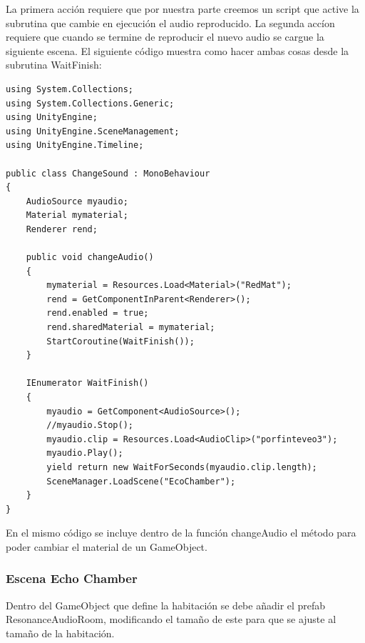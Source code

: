 \quad La primera acción requiere que por nuestra parte creemos un script que active la subrutina que cambie en ejecución el audio reproducido. La segunda accíon requiere que cuando se termine de reproducir el nuevo audio se cargue la siguiente escena. El siguiente código muestra como hacer ambas cosas desde la subrutina WaitFinish:\\

\lstset{language=[sharp]C, breaklines=true, basicstyle=\footnotesize}
\begin{lstlisting}[frame=single, caption={ChangeSound.cs}]
using System.Collections;
using System.Collections.Generic;
using UnityEngine;
using UnityEngine.SceneManagement;
using UnityEngine.Timeline;

public class ChangeSound : MonoBehaviour
{
    AudioSource myaudio;
    Material mymaterial;
    Renderer rend;

    public void changeAudio()
    {
        mymaterial = Resources.Load<Material>("RedMat");
        rend = GetComponentInParent<Renderer>();
        rend.enabled = true;
        rend.sharedMaterial = mymaterial;
        StartCoroutine(WaitFinish());
    }

    IEnumerator WaitFinish()
    {
        myaudio = GetComponent<AudioSource>();
        //myaudio.Stop();
        myaudio.clip = Resources.Load<AudioClip>("porfinteveo3");
        myaudio.Play();
        yield return new WaitForSeconds(myaudio.clip.length);
        SceneManager.LoadScene("EcoChamber");
    }
}

\end{lstlisting}

\quad En el mismo código se incluye dentro de la función changeAudio el método para poder cambiar el material de un GameObject.\\

	\subsubsection{Escena Echo Chamber}
\quad Dentro del GameObject que define la habitación se debe añadir el prefab ResonanceAudioRoom, modificando el tamaño de este para que se ajuste al tamaño de la habitación.


